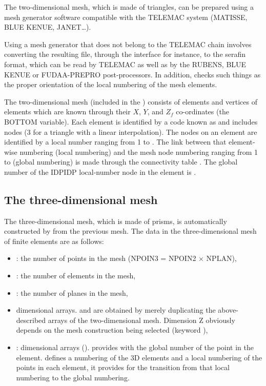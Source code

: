 The two-dimensional mesh, which is made of triangles, can be prepared using a
mesh generator software compatible with the TELEMAC system (MATISSE,
BLUE KENUE, JANET\dots).

Using a mesh generator that does not belong to the TELEMAC chain involves
converting the resulting file, through the \stbtel interface for instance, to
the serafin format, which can be read by TELEMAC as well as by the RUBENS, BLUE
KENUE or FUDAA-PREPRO post-processors. In addition, \stbtel checks such
things as the proper orientation of the local numbering of the mesh elements.

The two-dimensional mesh (included in the ) consists of
 elements and  vertices of elements which are
known through their $X$, $Y$, and $Z_{f}$ co-ordinates (the BOTTOM
variable). Each element is identified by a code known as  and
includes  nodes (3 for a triangle with a linear interpolation).
The nodes on an element are identified by a local number ranging from 1 to
. The link between that element-wise numbering (local numbering)
and the mesh node numbering ranging from 1 to  (global numbering)
is made through the connectivity table .
The global number of the IDPIDP local-number node in the  element
is .


\subsection{The three-dimensional mesh}

The three-dimensional mesh, which is made of prisms, is automatically
constructed by  from the previous mesh. The data in the
three-dimensional mesh of finite elements are as follows:

\begin{itemize}
\item {}: the number of points in the mesh (NPOIN3 = NPOIN2 $\times$
NPLAN),
\item {}: the number of elements in the mesh,
\item {}: the number of planes in the mesh,
\item {} dimensional arrays.  and 
are obtained by merely duplicating the above-described arrays of the two-dimensional
mesh. Dimension Z obviously depends on the mesh construction being selected
(keyword ),
\item {}: dimensional arrays ().
 provides with the global number of the  point
in the  element.  defines a numbering
of the 3D elements and a local numbering of the points in each element, it
provides for the transition from that local numbering to the global numbering.
\end{itemize}


